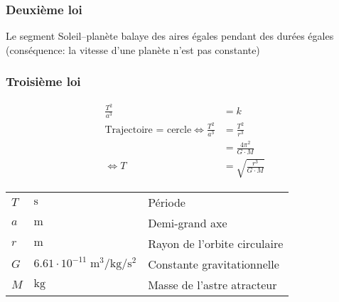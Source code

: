 \documentclass{article}
\newcommand{\deftable}[2]{%
\begin{table}[h]
    \centering
    \begin{tabular}{llp{100mm}}%
        #1
    \end{tabular}
    \label{tab:#2_units}
\end{table}%
}
\newcommand{\deftablevar}[3]{%
    $#1$ & $\si{#2}$ & #3 \\
}
\begin{document}
\subsubsection{Deuxième loi}
Le segment Soleil--planète balaye des aires égales pendant des durées égales (conséquence: la vitesse d'une planète n'est pas constante)

\subsubsection{Troisième loi}

\begin{equation*}
    \begin{split}
        \frac{T^2}{a^3} &= k \\
        \text{Trajectoire = cercle} \iff \frac{T^2}{a^3} &= \frac{T^2}{r^3} \\
        &= \frac{4\pi^2}{G\cdot M} \\
        \iff T &= \sqrt{\frac{r^3}{G\cdot M}}
    \end{split}
\end{equation*}

\deftable{
    \deftablevar{T}{\second}{Période}
    \deftablevar{a}{\meter}{Demi-grand axe}
    \deftablevar{r}{\meter}{Rayon de l'orbite circulaire}
    \deftablevar{G}{6.61\cdot10^{-11}\;\meter\cubed\per\kilo\gram\per\second\squared}{Constante gravitationnelle}
    \deftablevar{M}{\kilo\gram}{Masse de l'astre atracteur}
}{troisieme_loi_kepler}
\end{document}
